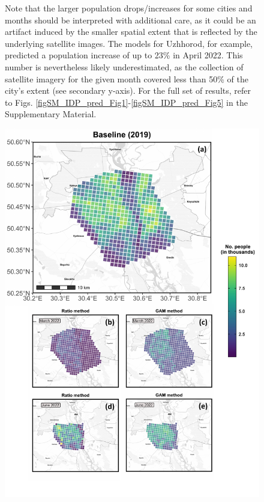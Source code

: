 \documentclass[sn-basic]{sn-jnl}%
\begin{document}
{\begin{figure}[hbtp]
{Note that the larger population drops/increases for some cities and months should be interpreted with additional care, as it could be an artifact induced by the smaller spatial extent that is reflected by the underlying satellite images. The models for Uzhhorod, for example, predicted a population increase of up to 23\% in April 2022. This number is nevertheless likely underestimated, as the collection of satellite imagery for the given month covered less than 50\% of the city's extent (see secondary y-axis).
For the full set of results, refer to Figs. \ref{figSM_IDP_pred_Fig1}-\ref{figSM_IDP_pred_Fig5} in the Supplementary Material.}
\label{Fig_IDP_pred}
\end{figure}


\begin{figure}[hbtp]
\begin{center}
\includegraphics[scale = 0.6]{Figures/Main_gridded_predictions.pdf}

\end{center}
\end{figure}}
\end{document}
